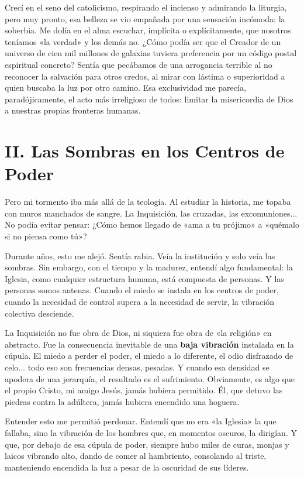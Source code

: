 \documentclass[12pt,twoside,openany]{book}
\begin{document}
Crecí en el seno del catolicismo, respirando el incienso y admirando la liturgia, pero muy pronto, esa belleza se vio empañada por una sensación incómoda: la soberbia. Me dolía en el alma escuchar, implícita o explícitamente, que nosotros teníamos «la verdad» y los demás no. ¿Cómo podía ser que el Creador de un universo de cien mil millones de galaxias tuviera preferencia por un código postal espiritual concreto? Sentía que pecábamos de una arrogancia terrible al no reconocer la salvación para otros credos, al mirar con lástima o superioridad a quien buscaba la luz por otro camino. Esa exclusividad me parecía, paradójicamente, el acto más irreligioso de todos: limitar la misericordia de Dios a nuestras propias fronteras humanas.

\section*{II. Las Sombras en los Centros de Poder}

Pero mi tormento iba más allá de la teología. Al estudiar la historia, me topaba con muros manchados de sangre. La Inquisición, las cruzadas, las excomuniones... No podía evitar pensar: ¿Cómo hemos llegado de «ama a tu prójimo» a «quémalo si no piensa como tú»?

Durante años, esto me alejó. Sentía rabia. Veía la institución y solo veía las sombras. Sin embargo, con el tiempo y la madurez, entendí algo fundamental: la Iglesia, como cualquier estructura humana, está compuesta de personas. Y las personas somos antenas. Cuando el miedo se instala en los centros de poder, cuando la necesidad de control supera a la necesidad de servir, la vibración colectiva desciende.

La Inquisición no fue obra de Dios, ni siquiera fue obra de «la religión» en abstracto. Fue la consecuencia inevitable de una \textbf{baja vibración} instalada en la cúpula. El miedo a perder el poder, el miedo a lo diferente, el odio disfrazado de celo... todo eso son frecuencias densas, pesadas. Y cuando esa densidad se apodera de una jerarquía, el resultado es el sufrimiento. Obviamente, es algo que el propio Cristo, mi amigo Jesús, jamás hubiera permitido. Él, que detuvo las piedras contra la adúltera, jamás hubiera encendido una hoguera.

Entender esto me permitió perdonar. Entendí que no era «la Iglesia» la que fallaba, sino la vibración de los hombres que, en momentos oscuros, la dirigían. Y que, por debajo de esa cúpula de poder, siempre hubo miles de curas, monjas y laicos vibrando alto, dando de comer al hambriento, consolando al triste, manteniendo encendida la luz a pesar de la oscuridad de sus líderes.
\end{document}
